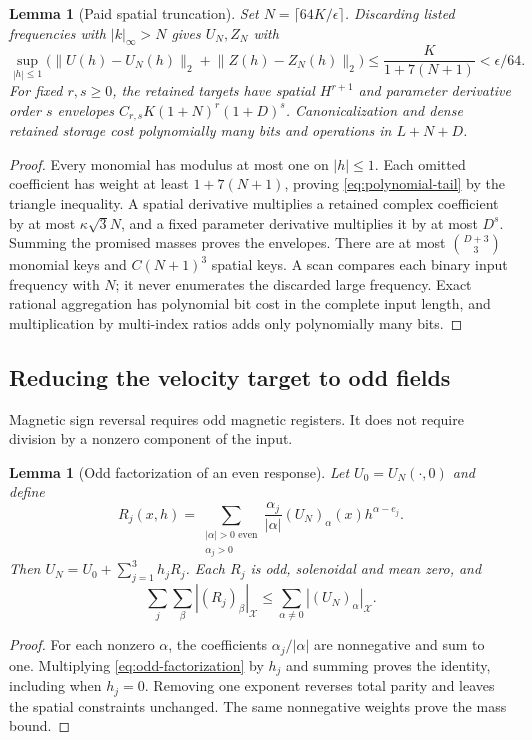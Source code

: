 \documentclass[11pt,a4paper]{amsart}
\newtheorem{lemma}[theorem]{Lemma}
\theoremstyle{definition}
\theoremstyle{remark}
\numberwithin{equation}{section}
\newcommand{\norm}[1]{\lVert #1\rVert}
\begin{document}
\begin{lemma}[Paid spatial truncation]\label{lem:polynomial-truncation}
Set $N=\lceil64K/\epsilon\rceil$. Discarding listed frequencies with
$|k|_\infty>N$ gives $U_N,Z_N$ with
\begin{equation}\label{eq:polynomial-tail}
 \sup_{|h|\le1}\bigl(\norm{U(h)-U_N(h)}_2+
               \norm{Z(h)-Z_N(h)}_2\bigr)
 \le\frac K{1+7(N+1)}<\epsilon/64.
\end{equation}
For fixed $r,s\ge0$, the retained targets have spatial $H^{r+1}$ and
parameter derivative order $s$ envelopes $C_{r,s}K(1+N)^r(1+D)^s$.
Canonicalization and dense retained storage cost polynomially many bits and
operations in $L+N+D$.
\end{lemma}
\begin{proof}
Every monomial has modulus at most one on $|h|\le1$. Each omitted coefficient
has weight at least $1+7(N+1)$, proving \eqref{eq:polynomial-tail} by the
triangle inequality. A spatial derivative multiplies a retained complex
coefficient by at most $\kappa\sqrt3N$, and a fixed parameter derivative
multiplies it by at most $D^s$. Summing the promised masses proves the
envelopes. There are at most $\binom{D+3}{3}$ monomial keys and $C(N+1)^3$
spatial keys. A scan compares each binary input frequency with $N$; it never
enumerates the discarded large frequency. Exact rational aggregation has
polynomial bit cost in the complete input length, and multiplication by
multi-index ratios adds only polynomially many bits.
\end{proof}

\subsection{Reducing the velocity target to odd fields}
Magnetic sign reversal requires odd magnetic registers. It does not require
division by a nonzero component of the input.
\begin{lemma}[Odd factorization of an even response]\label{lem:odd-factorization}
Let $U_0=U_N(\cdot,0)$ and define
\begin{equation}\label{eq:odd-factorization}
 R_j(x,h)=\sum_{\substack{|\alpha|>0\text{ even}\\\alpha_j>0}}
     \frac{\alpha_j}{|\alpha|}(U_N)_\alpha(x)h^{\alpha-e_j}.
\end{equation}
Then $U_N=U_0+\sum_{j=1}^3h_jR_j$. Each $R_j$ is odd, solenoidal and
mean zero, and
\[
 \sum_j\sum_\beta |(R_j)_\beta|_{\mathcal X}
 \le\sum_{\alpha\ne0}|(U_N)_\alpha|_{\mathcal X}.
\]
\end{lemma}
\begin{proof}
For each nonzero $\alpha$, the coefficients $\alpha_j/|\alpha|$ are
nonnegative and sum to one. Multiplying \eqref{eq:odd-factorization} by
$h_j$ and summing proves the identity, including when $h_j=0$. Removing
one exponent reverses total parity and leaves the spatial constraints
unchanged. The same nonnegative weights prove the mass bound.
\end{proof}
\end{document}
